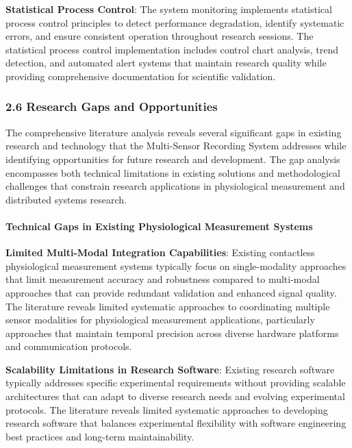 \documentclass[12pt,a4paper]{report}
\begin{document}
\textbf{Statistical Process Control}: The system monitoring implements statistical process control principles to detect
performance degradation, identify systematic errors, and ensure consistent operation throughout research sessions. The
statistical process control implementation includes control chart analysis, trend detection, and automated alert systems
that maintain research quality while providing comprehensive documentation for scientific validation.

\subsubsection{2.6 Research Gaps and Opportunities}

The comprehensive literature analysis reveals several significant gaps in existing research and technology that the
Multi-Sensor Recording System addresses while identifying opportunities for future research and development. The gap
analysis encompasses both technical limitations in existing solutions and methodological challenges that constrain
research applications in physiological measurement and distributed systems research.

\paragraph{Technical Gaps in Existing Physiological Measurement Systems}

\textbf{Limited Multi-Modal Integration Capabilities}: Existing contactless physiological measurement systems typically focus
on single-modality approaches that limit measurement accuracy and robustness compared to multi-modal approaches that can
provide redundant validation and enhanced signal quality. The literature reveals limited systematic approaches to
coordinating multiple sensor modalities for physiological measurement applications, particularly approaches that
maintain temporal precision across diverse hardware platforms and communication protocols.

\textbf{Scalability Limitations in Research Software}: Existing research software typically addresses specific experimental
requirements without providing scalable architectures that can adapt to diverse research needs and evolving experimental
protocols. The literature reveals limited systematic approaches to developing research software that balances
experimental flexibility with software engineering best practices and long-term maintainability.
\end{document}
